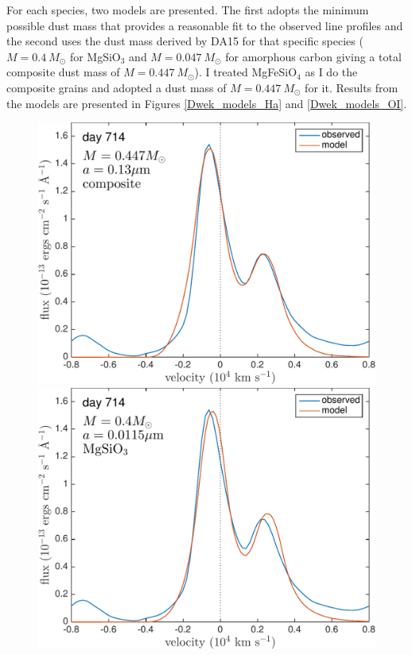 For each species, two models are presented.  The first adopts the minimum 
possible dust mass that provides a reasonable fit to the observed line 
profiles and the second uses the dust mass derived by DA15 for that 
specific species ($M=0.4~M_{\odot}$ for MgSiO$_3$ and $M=0.047~M_{\odot}$ 
for amorphous carbon giving a total composite dust mass of 
$M=0.447~M_{\odot}$).  I treated MgFeSiO$_4$ as I do the composite 
grains and adopted a dust mass of $M=0.447~M_{\odot}$ for it.  Results 
from the models are presented in Figures \ref{Dwek_models_Ha} and 
\ref{Dwek_models_OI}.


\begin{landscape}
\begin{figure}
\includegraphics[trim =0 20 0 0,clip=true,scale=0.33]{chapters/chapter5/images/silicates_take2/OI/composit_Dwek.pdf}
\includegraphics[trim =25 20 0 0,clip=true,scale=0.33]{chapters/chapter5/images/silicates_take2/OI/MgSiO3_Dwek.pdf}

\end{figure}
\end{landscape}
